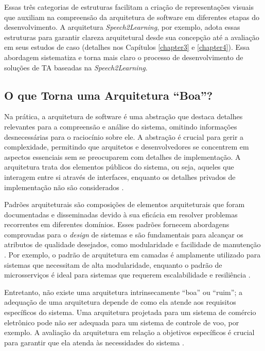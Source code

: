 Essas três categorias de estruturas facilitam a criação de representações visuais que auxiliam na compreensão da arquitetura de software em diferentes etapas do desenvolvimento. A arquitetura \textit{Speech2Learning}, por exemplo, adota essas estruturas para garantir clareza arquitetural desde sua concepção até a avaliação em seus estudos de caso (detalhes nos Capítulos \ref{chapter3} e \ref{chapter4}). Essa abordagem sistematiza e torna mais claro o processo de desenvolvimento de soluções de TA baseadas na \textit{Speech2Learning}.

\subsection{O que Torna uma Arquitetura ``Boa''?}

Na prática, a arquitetura de software é uma abstração que destaca detalhes relevantes para a compreensão e análise do sistema, omitindo informações desnecessárias para o raciocínio sobre ele. A abstração é crucial para gerir a complexidade, permitindo que arquitetos e desenvolvedores se concentrem em aspectos essenciais sem se preocuparem com detalhes de implementação. A arquitetura trata dos elementos públicos do sistema, ou seja, aqueles que interagem entre si através de interfaces, enquanto os detalhes privados de implementação não são considerados \cite{Bass2021}.

Padrões arquiteturais são composições de elementos arquiteturais que foram documentadas e disseminadas devido à sua eficácia em resolver problemas recorrentes em diferentes domínios. Esses padrões fornecem abordagens comprovadas para o \textit{design} de sistemas e são fundamentais para alcançar os atributos de qualidade desejados, como modularidade e facilidade de manutenção \cite{Bass2021}. Por exemplo, o padrão de arquitetura em camadas é amplamente utilizado para sistemas que necessitam de alta modularidade, enquanto o padrão de microsserviços é ideal para sistemas que requerem escalabilidade e resiliência \cite{Pressman2016, Sommerville2015}.

Entretanto, não existe uma arquitetura intrinsecamente ``boa'' ou ``ruim''; a adequação de uma arquitetura depende de como ela atende aos requisitos específicos do sistema. Uma arquitetura projetada para um sistema de comércio eletrônico pode não ser adequada para um sistema de controle de voo, por exemplo. A avaliação da arquitetura em relação a objetivos específicos é crucial para garantir que ela atenda às necessidades do sistema \cite{Pressman2016, Sommerville2015}.

